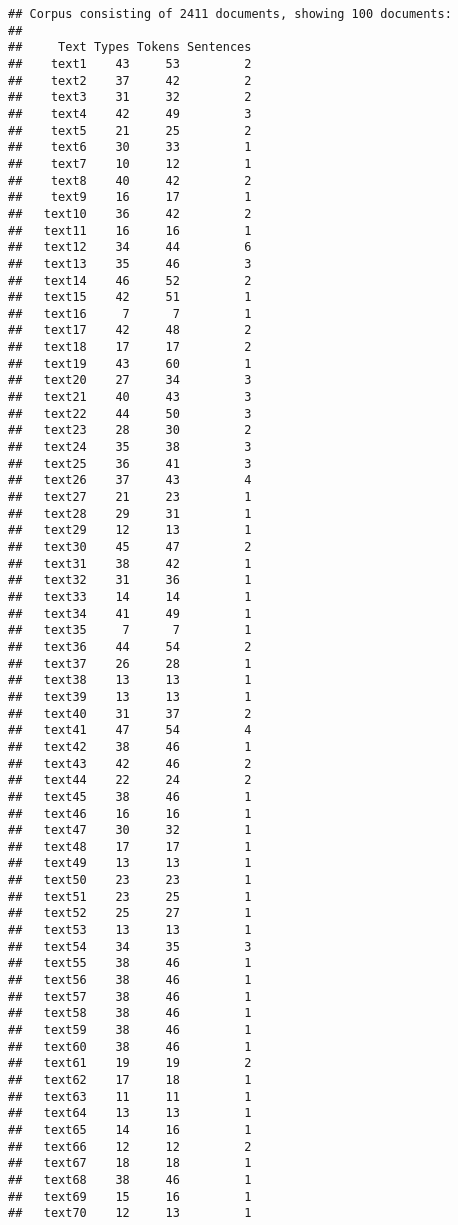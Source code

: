 \documentclass[
]{article}
\begin{document}
\begin{verbatim}
## Corpus consisting of 2411 documents, showing 100 documents:
## 
##     Text Types Tokens Sentences
##    text1    43     53         2
##    text2    37     42         2
##    text3    31     32         2
##    text4    42     49         3
##    text5    21     25         2
##    text6    30     33         1
##    text7    10     12         1
##    text8    40     42         2
##    text9    16     17         1
##   text10    36     42         2
##   text11    16     16         1
##   text12    34     44         6
##   text13    35     46         3
##   text14    46     52         2
##   text15    42     51         1
##   text16     7      7         1
##   text17    42     48         2
##   text18    17     17         2
##   text19    43     60         1
##   text20    27     34         3
##   text21    40     43         3
##   text22    44     50         3
##   text23    28     30         2
##   text24    35     38         3
##   text25    36     41         3
##   text26    37     43         4
##   text27    21     23         1
##   text28    29     31         1
##   text29    12     13         1
##   text30    45     47         2
##   text31    38     42         1
##   text32    31     36         1
##   text33    14     14         1
##   text34    41     49         1
##   text35     7      7         1
##   text36    44     54         2
##   text37    26     28         1
##   text38    13     13         1
##   text39    13     13         1
##   text40    31     37         2
##   text41    47     54         4
##   text42    38     46         1
##   text43    42     46         2
##   text44    22     24         2
##   text45    38     46         1
##   text46    16     16         1
##   text47    30     32         1
##   text48    17     17         1
##   text49    13     13         1
##   text50    23     23         1
##   text51    23     25         1
##   text52    25     27         1
##   text53    13     13         1
##   text54    34     35         3
##   text55    38     46         1
##   text56    38     46         1
##   text57    38     46         1
##   text58    38     46         1
##   text59    38     46         1
##   text60    38     46         1
##   text61    19     19         2
##   text62    17     18         1
##   text63    11     11         1
##   text64    13     13         1
##   text65    14     16         1
##   text66    12     12         2
##   text67    18     18         1
##   text68    38     46         1
##   text69    15     16         1
##   text70    12     13         1

\end{verbatim}
\end{document}

